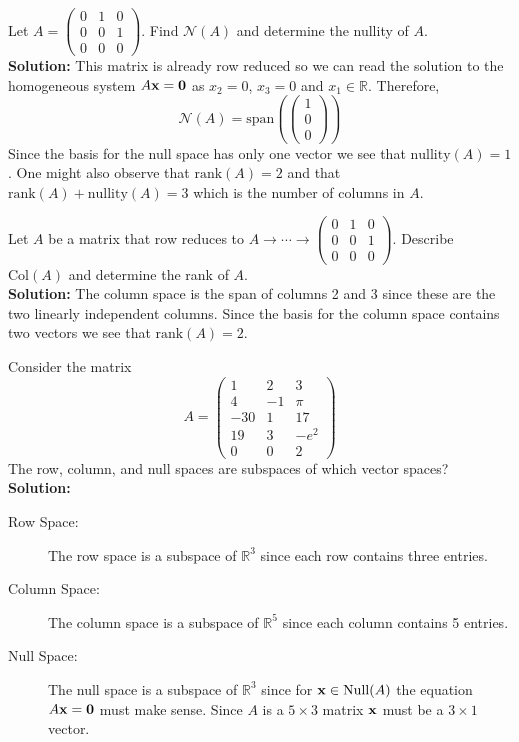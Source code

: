 \begin{example}
    Let $A = \begin{pmatrix} 0 & 1 & 0 \\ 0 & 0 & 1 \\ 0 & 0 & 0 \end{pmatrix}$.  Find
    $\mathcal{N}(A)$ and determine the nullity of $A$.\\
    {\bf Solution: } This matrix is already row reduced so we can read the solution to the
    homogeneous system $A {\bf x} = {\bf 0}$ as $x_2 = 0$, $x_3 = 0$ and $x_1 \in \mathbb{R}$.
    Therefore,
    \[ \mathcal{N}(A) = \text{span}\left( \begin{pmatrix}1\\0\\0\end{pmatrix} \right) \]
    Since the basis for the null space has only one vector we see that $\text{nullity}(A)
    = 1$.  One might also observe that $\text{rank}(A) = 2$ and that $\text{rank}(A) +
    \text{nullity}(A) = 3$ which is the number of columns in $A$.
\end{example}

\begin{example}
    Let $A$ be a matrix that row reduces to $A \to \cdots \to \begin{pmatrix} 0 & 1 & 0 \\
        0 & 0 & 1 \\ 0 & 0 & 0 \end{pmatrix}$.  Describe $\text{Col}(A)$ and determine the
    rank of $A$.\\
    {\bf Solution: } The column space is
    the span of columns 2 and 3 since these are the two linearly independent columns.
    Since the basis for the column space contains two vectors we see that $\text{rank}(A)
    = 2$.  
\end{example}

\begin{example}
    Consider the matrix 
    \[ A = \begin{pmatrix} 1 & 2 & 3 \\ 4 & -1 & \pi \\ -30 & 1 & 17 \\ 19 & 3 & -e^2 \\ 0
        & 0 & 2 \end{pmatrix} \]
    The row, column, and null spaces are subspaces of which vector spaces? \\
    {\bf Solution:} 
    \begin{description}
        \item[Row Space: ] The row space is a subspace of $\mathbb{R}^3$ since each row
            contains three entries.
        \item[Column Space: ] The column space is a subspace of $\mathbb{R}^5$ since each
            column contains 5 entries.
        \item[Null Space: ] The null space is a subspace of $\mathbb{R}^3$ since for ${\bf x}
            \in \text{Null}(A)$ the equation $A{\bf x} = {\bf 0}$ must make sense.  Since
            $A$ is a $5 \times 3$ matrix ${\bf x}$ must be a $3 \times 1$ vector.
    \end{description}
\end{example}


